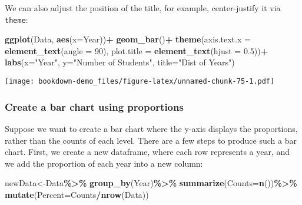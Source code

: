 \documentclass[
]{book}
\newenvironment{Shaded}{\begin{snugshade}}{\end{snugshade}}
\newcommand{\AttributeTok}[1]{\textcolor[rgb]{0.13,0.29,0.53}{#1}}
\newcommand{\DecValTok}[1]{\textcolor[rgb]{0.00,0.00,0.81}{#1}}
\newcommand{\FloatTok}[1]{\textcolor[rgb]{0.00,0.00,0.81}{#1}}
\newcommand{\FunctionTok}[1]{\textcolor[rgb]{0.13,0.29,0.53}{\textbf{#1}}}
\newcommand{\NormalTok}[1]{#1}
\newcommand{\OtherTok}[1]{\textcolor[rgb]{0.56,0.35,0.01}{#1}}
\newcommand{\SpecialCharTok}[1]{\textcolor[rgb]{0.81,0.36,0.00}{\textbf{#1}}}
\newcommand{\StringTok}[1]{\textcolor[rgb]{0.31,0.60,0.02}{#1}}
\begin{document}
We can also adjust the position of the title, for example, center-justify it via \texttt{theme}:

\begin{Shaded}
\begin{Highlighting}[]
\FunctionTok{ggplot}\NormalTok{(Data, }\FunctionTok{aes}\NormalTok{(}\AttributeTok{x=}\NormalTok{Year))}\SpecialCharTok{+}
  \FunctionTok{geom\_bar}\NormalTok{()}\SpecialCharTok{+}
  \FunctionTok{theme}\NormalTok{(}\AttributeTok{axis.text.x =} \FunctionTok{element\_text}\NormalTok{(}\AttributeTok{angle =} \DecValTok{90}\NormalTok{), }
        \AttributeTok{plot.title =} \FunctionTok{element\_text}\NormalTok{(}\AttributeTok{hjust =} \FloatTok{0.5}\NormalTok{))}\SpecialCharTok{+}
  \FunctionTok{labs}\NormalTok{(}\AttributeTok{x=}\StringTok{"Year"}\NormalTok{, }\AttributeTok{y=}\StringTok{"Number of Students"}\NormalTok{, }\AttributeTok{title=}\StringTok{"Dist of Years"}\NormalTok{)}
\end{Highlighting}
\end{Shaded}

\texttt{[image: bookdown-demo\_files/figure-latex/unnamed-chunk-75-1.pdf]}

\hypertarget{create-a-bar-chart-using-proportions}{%
\subsubsection{Create a bar chart using proportions}\label{create-a-bar-chart-using-proportions}}

Suppose we want to create a bar chart where the y-axis displays the proportions, rather than the counts of each level. There are a few steps to produce such a bar chart. First, we create a new dataframe, where each row represents a year, and we add the proportion of each year into a new column:

\begin{Shaded}
\begin{Highlighting}[]
\NormalTok{newData}\OtherTok{\textless{}{-}}\NormalTok{Data}\SpecialCharTok{\%\textgreater{}\%}
  \FunctionTok{group\_by}\NormalTok{(Year)}\SpecialCharTok{\%\textgreater{}\%}
  \FunctionTok{summarize}\NormalTok{(}\AttributeTok{Counts=}\FunctionTok{n}\NormalTok{())}\SpecialCharTok{\%\textgreater{}\%}
  \FunctionTok{mutate}\NormalTok{(}\AttributeTok{Percent=}\NormalTok{Counts}\SpecialCharTok{/}\FunctionTok{nrow}\NormalTok{(Data))}
\end{Highlighting}
\end{Shaded}
\end{document}
